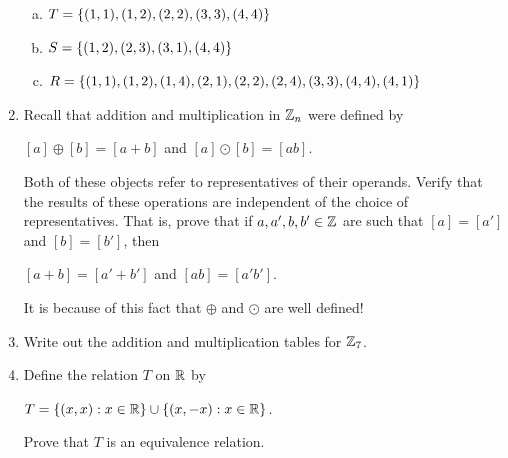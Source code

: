 \documentclass[11pt,fleqn,dvipsnames,usenames]{article}
\newcommand{\p}{\noindent}
\begin{document}
\begin{enumerate}
\begin{enumerate}[(a)]
\item $T = \left\{(1,1), (1,2), (2,2), (3,3), (4,4)\right\}$
\item $S = \left\{(1,2), (2,3), (3,1), (4,4)\right\}$
\item $R = \left\{(1,1), (1,2), (1,4), (2,1), (2,2), (2,4), (3,3), (4,4), (4,1)\right\}$
\end{enumerate}
\item Recall that addition and multiplication in $\mathbb{Z}_n$ were defined by
\begin{center}
$[a] \oplus [b] = [a + b]$ and $[a]\odot [b] = [ab]$.
\end{center}
\p Both of these objects refer to representatives of their operands.  Verify that the results of these operations are independent of the choice of representatives.  That is, prove that if $a,a',b,b'\in\mathbb{Z}$ are such that $[a] = [a']$ and $[b] = [b']$, then
\begin{center}
$[a + b] = [a' + b']$ and $[ab] = [a'b']$.
\end{center}

\note It is because of this fact that $\oplus$ and $\odot$ are well defined!

\item Write out the addition and multiplication tables for $\mathbb{Z}_7$.

\item Define the relation $T$ on $\mathbb{R}$ by
\begin{center}
$T = \left\{(x,x): x\in\mathbb{R}\right\}\cup \left\{(x,-x): x\in\mathbb{R}\right\}$.
\end{center}
Prove that $T$ is an equivalence relation.


\end{enumerate}
\end{document}
